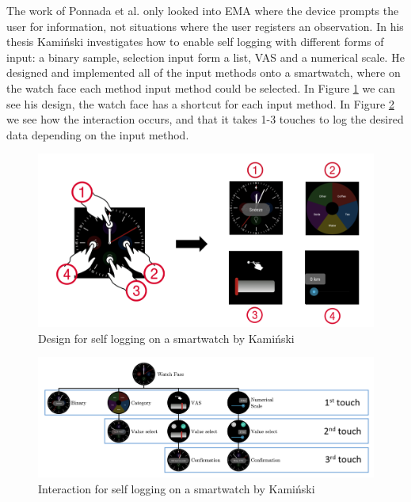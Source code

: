 The work of Ponnada et al. only looked into EMA where the device prompts the user for information, not situations where the user registers an observation. In his thesis Kami\'nski\cite{tomas} investigates how to enable self logging with different forms of input: a binary sample, selection input form a list, VAS and a numerical scale. He designed and implemented all of the input methods onto a smartwatch, where on the watch face each method input method could be selected. In Figure \ref{tomas_design} we can see his design, the watch face has a shortcut for each input method. In Figure \ref{tomas_design2} we see how the interaction occurs, and that it takes 1-3 touches to log the desired data depending on the input method.

\begin{figure}[h!]
    \centering
    \includegraphics[width=1\textwidth]{figures/tomas_design.png}
    \caption{Design for self logging on a smartwatch by Kami\'nski\cite[p.23]{tomas}}
    \label{tomas_design}
\end{figure}

\begin{figure}[h!]
    \centering
    \includegraphics[width=1\textwidth]{figures/tomas_design2.png}
    \caption{Interaction for self logging on a smartwatch by Kami\'nski\cite[p.23]{tomas}}
    \label{tomas_design2}
\end{figure}

